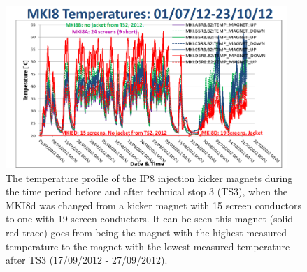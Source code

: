 \begin{figure}
\begin{center}
\includegraphics[width=0.95\textwidth]{LHC_MKI/figures/mki8-temps-post-ts3.png}
\end{center}
\caption{The temperature profile of the IP8 injection kicker magnets during the time period before and after technical stop 3  (TS3), when the MKI8d was changed from a kicker magnet with 15 screen conductors to one with 19 screen conductors. It can be seen this magnet (solid red trace) goes from being the magnet with the highest measured temperature to the magnet with the lowest measured temperature after TS3 (17/09/2012 - 27/09/2012).}
\label{fig:heating-mki8-post-ts3}
\end{figure}